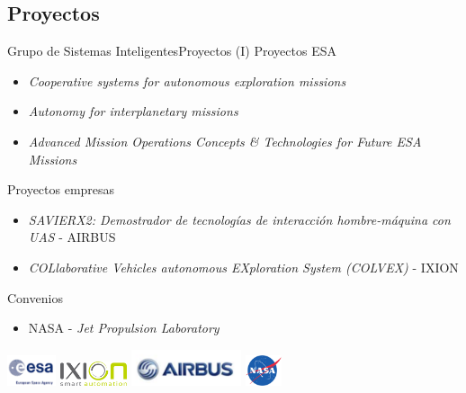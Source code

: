 \documentclass[10pt,compress]{beamer} %
\begin{document}
\subsection{Proyectos}
\begin{frame}{Grupo de Sistemas Inteligentes}{Proyectos (I)}
    Proyectos ESA
        \begin{itemize}
            \item \textit{Cooperative systems for autonomous exploration missions}
            \item \textit{Autonomy for interplanetary missions}
            \item \textit{Advanced Mission Operations Concepts \& Technologies for Future ESA Missions}
        \end{itemize}
    Proyectos empresas
        \begin{itemize}
        \item \textit{SAVIERX2: Demostrador de tecnologías de interacción hombre-máquina con UAS} - AIRBUS
        \item \textit{COLlaborative Vehicles autonomous EXploration System (COLVEX)} - IXION
        \end{itemize}

	 Convenios
        \begin{itemize}
            \item NASA - \textit{Jet Propulsion Laboratory}
        \end{itemize}
    
     \smallskip 
     \centering

    \includegraphics[height=25pt]{figs/esalogo}
    \quad
    \includegraphics[height=20pt]{figs/ixionlogo}
    \quad
    \includegraphics[height=30pt]{figs/airbuslogo}     
    \quad
    \includegraphics[height=25pt]{figs/NASA}

    \note{
    }  
\end{frame}
\end{document}

